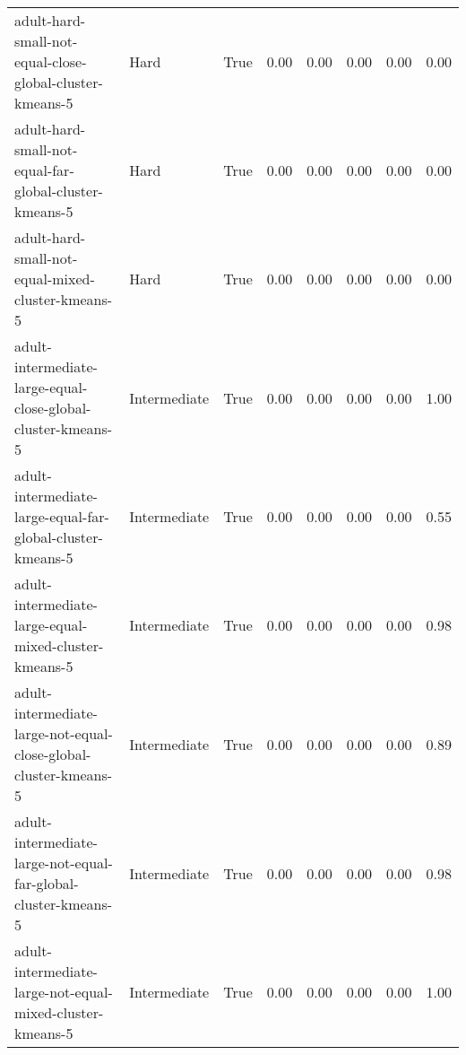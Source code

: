 \begin{longtable}{llllllll}
                               adult-hard-small-not-equal-close-global-cluster-kmeans-5 &         Hard &        True &                 0.00 &                 0.00 &                         0.00 &                         0.00 &                         0.00 \\
                                 adult-hard-small-not-equal-far-global-cluster-kmeans-5 &         Hard &        True &                 0.00 &                 0.00 &                         0.00 &                         0.00 &                         0.00 \\
                                      adult-hard-small-not-equal-mixed-cluster-kmeans-5 &         Hard &        True &                 0.00 &                 0.00 &                         0.00 &                         0.00 &                         0.00 \\
                           adult-intermediate-large-equal-close-global-cluster-kmeans-5 & Intermediate &        True &                 0.00 &                 0.00 &                         0.00 &                         0.00 &                         1.00 \\
                             adult-intermediate-large-equal-far-global-cluster-kmeans-5 & Intermediate &        True &                 0.00 &                 0.00 &                         0.00 &                         0.00 &                         0.55 \\
                                  adult-intermediate-large-equal-mixed-cluster-kmeans-5 & Intermediate &        True &                 0.00 &                 0.00 &                         0.00 &                         0.00 &                         0.98 \\
                       adult-intermediate-large-not-equal-close-global-cluster-kmeans-5 & Intermediate &        True &                 0.00 &                 0.00 &                         0.00 &                         0.00 &                         0.89 \\
                         adult-intermediate-large-not-equal-far-global-cluster-kmeans-5 & Intermediate &        True &                 0.00 &                 0.00 &                         0.00 &                         0.00 &                         0.98 \\
                              adult-intermediate-large-not-equal-mixed-cluster-kmeans-5 & Intermediate &        True &                 0.00 &                 0.00 &                         0.00 &                         0.00 &                         1.00 \\

\end{longtable}
